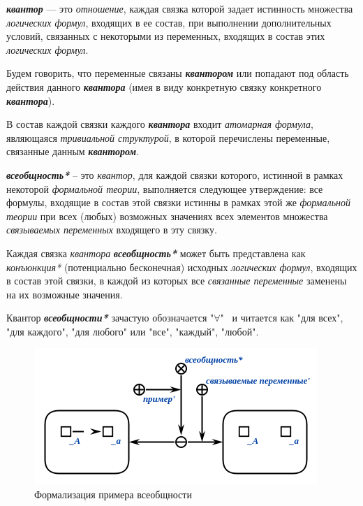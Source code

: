 \textbf{\textit{квантор}} — это \textit{отношение}, каждая связка которой задает истинность множества \textit{логических формул}, входящих в ее состав, при выполнении дополнительных условий, связанных с некоторыми из переменных, входящих в состав этих \textit{логических формул}.

Будем говорить, что переменные связаны \textbf{\textit{квантором}} или попадают под область действия данного \textbf{\textit{квантора}} (имея в виду конкретную связку конкретного \textbf{\textit{квантора}}).

В состав каждой связки каждого \textbf{\textit{квантора}} входит \textit{атомарная формула}, являющаяся \textit{тривиальной структурой}, в которой перечислены переменные, связанные данным \textbf{\textit{квантором}}.

\begin{SCn}
\end{SCn}

\textbf{\textit{всеобщность*}} -- это \textit{квантор}, для каждой связки которого, истинной в рамках некоторой \textit{формальной теории}, выполняется следующее утверждение: все формулы, входящие в состав этой связки истинны в рамках этой же \textit{формальной теории} при всех (любых) возможных значениях всех элементов множества \textit{связываемых переменных\scnrolesign} входящего в эту связку.

Каждая связка \textit{квантора} \textbf{\textit{всеобщность*}} может быть представлена как \textit{конъюнкция*} (потенциально бесконечная) исходных \textit{логических формул}, входящих в состав этой связки, в каждой из которых все \textit{связанные переменные\scnrolesign} заменены на их возможные значения.

Квантор \textbf{\textit{всеобщности*}} зачастую обозначается "$\forall$" \ и читается как "для всех"{}, "для каждого"{}, "для любого"{} или "все"{}, "каждый"{}, "любой".

\begin{figure}[http]
\includegraphics[scale=0.8]{author/part2/figures/logic/universality.png}
\caption{Формализация примера всеобщности}
\label{fig:universality}
\end{figure}

